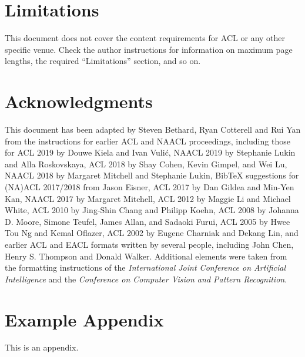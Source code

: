 \documentclass[11pt]{article}
\begin{document}
\section*{Limitations}

This document does not cover the content requirements for ACL or any
other specific venue.  Check the author instructions for
information on
maximum page lengths, the required ``Limitations'' section,
and so on.

\section*{Acknowledgments}

This document has been adapted
by Steven Bethard, Ryan Cotterell and Rui Yan
from the instructions for earlier ACL and NAACL proceedings, including those for
ACL 2019 by Douwe Kiela and Ivan Vuli\'{c},
NAACL 2019 by Stephanie Lukin and Alla Roskovskaya,
ACL 2018 by Shay Cohen, Kevin Gimpel, and Wei Lu,
NAACL 2018 by Margaret Mitchell and Stephanie Lukin,
Bib\TeX{} suggestions for (NA)ACL 2017/2018 from Jason Eisner,
ACL 2017 by Dan Gildea and Min-Yen Kan,
NAACL 2017 by Margaret Mitchell,
ACL 2012 by Maggie Li and Michael White,
ACL 2010 by Jing-Shin Chang and Philipp Koehn,
ACL 2008 by Johanna D. Moore, Simone Teufel, James Allan, and Sadaoki Furui,
ACL 2005 by Hwee Tou Ng and Kemal Oflazer,
ACL 2002 by Eugene Charniak and Dekang Lin,
and earlier ACL and EACL formats written by several people, including
John Chen, Henry S. Thompson and Donald Walker.
Additional elements were taken from the formatting instructions of the \emph{International Joint Conference on Artificial Intelligence} and the \emph{Conference on Computer Vision and Pattern Recognition}.

%



\appendix

\section{Example Appendix}
\label{sec:appendix}

This is an appendix.
\end{document}
